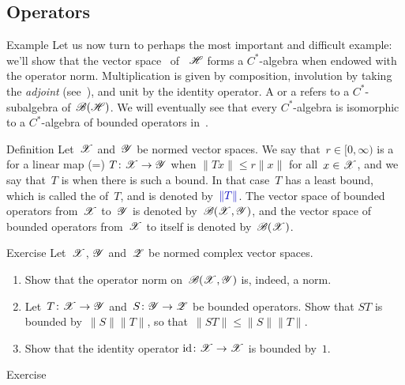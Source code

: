 \documentclass[a]{subfiles}
\begin{document}
\subsection{Operators}
\begin{parsec}[hilb]%
\begin{point}{Example}%
Let us now turn to perhaps the most important
and difficult example:
we'll show that the vector space~\Define{$\scrB(\scrH)$} 
of ~$\mathscr{H}$ forms a $C^*$-algebra
when endowed with the operator 
norm.
Multiplication is given by composition,
involution by taking the \emph{adjoint} (see~),
and unit by the identity operator.
A  or
a  
refers to a $C^*$-subalgebra of~$\scrB(\scrH)$.
We will eventually see that every $C^*$-algebra is isomorphic to a $C^*$-algebra
of bounded operators in~.
\end{point}
\begin{point}{Definition}%
Let~$\mathscr{X}$ and~$\mathscr{Y}$ be normed
vector spaces.
We say that~$r\in [0,\infty)$
is a  for a linear map (=) 
$T\colon \mathscr{X}\to\mathscr{Y}$
when  $\|Tx\|\leq r\|x\|$ for all~$x\in \mathscr{X}$,
and we say that~$T$ is 
when there is such a bound.
In that case~$T$ has a least bound,
which is called the  of~$T$,
and is denoted by~$\Define{\|T\|}$.
The vector space of bounded operators
from~$\mathscr{X}$ to~$\mathscr{Y}$
is denoted by~$\mathscr{B}(\mathscr{X},\mathscr{Y})$,
and the vector space of bounded operators
from~$\mathscr{X}$ to itself is denoted by~$\mathscr{B}(\mathscr{X})$.
\end{point}
\begin{point}{Exercise}%
Let~$\mathscr{X}$, $\mathscr{Y}$ and~$\mathscr{Z}$ be normed complex vector spaces.
\begin{enumerate}
\item
Show that the operator norm on~$\mathscr{B}(\mathscr{X},\mathscr{Y})$
is, indeed, a norm.
\item
Let~$T\colon \mathscr{X}\to \mathscr{Y}$ and~$S\colon \mathscr{Y}\to\mathscr{Z}$
be bounded operators.
Show that $ST$ is bounded by~$\|S\|\|T\|$,
so that~$\|ST\|\leq\|S\|\|T\|$.
\item
Show that the identity operator $\operatorname{id}\colon \mathscr{X}\to \mathscr{X}$
is bounded by~$1$.
\end{enumerate}
\end{point}
\begin{point}{Exercise}%

\end{point}
\end{parsec}
\end{document}
